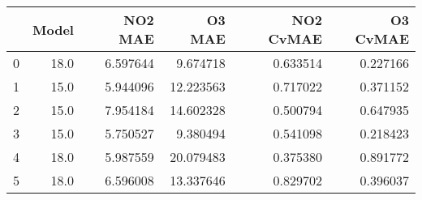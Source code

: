 \begin{tabular}{lrrrrr}
\toprule
{} &  Model &   NO2 MAE &     O3 MAE &  NO2 CvMAE &  O3 CvMAE \\
\midrule
0 &   18.0 &  6.597644 &   9.674718 &   0.633514 &  0.227166 \\
1 &   15.0 &  5.944096 &  12.223563 &   0.717022 &  0.371152 \\
2 &   15.0 &  7.954184 &  14.602328 &   0.500794 &  0.647935 \\
3 &   15.0 &  5.750527 &   9.380494 &   0.541098 &  0.218423 \\
4 &   18.0 &  5.987559 &  20.079483 &   0.375380 &  0.891772 \\
5 &   18.0 &  6.596008 &  13.337646 &   0.829702 &  0.396037 \\
\bottomrule
\end{tabular}
